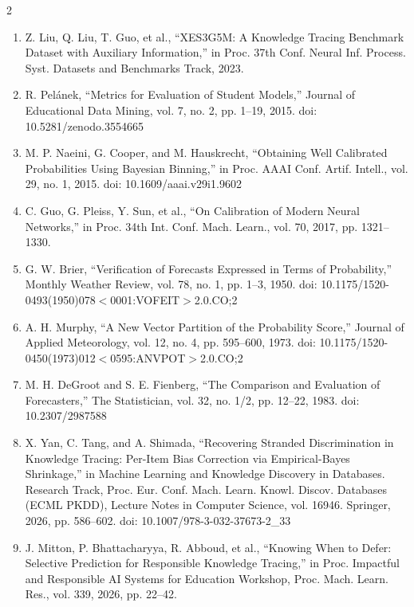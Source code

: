 \documentclass[10pt,a4paper]{article}
\begin{document}
\begin{multicols}{2}
{\begin{enumerate}
\item Z. Liu, Q. Liu, T. Guo, et al., ``XES3G5M: A Knowledge Tracing Benchmark Dataset with Auxiliary Information,'' in Proc. 37th Conf. Neural Inf. Process. Syst. Datasets and Benchmarks Track, 2023.

\item R. Pel\'{a}nek, ``Metrics for Evaluation of Student Models,'' Journal of Educational Data Mining, vol. 7, no. 2, pp. 1--19, 2015. doi: 10.5281/zenodo.3554665

\item M. P. Naeini, G. Cooper, and M. Hauskrecht, ``Obtaining Well Calibrated Probabilities Using Bayesian Binning,'' in Proc. AAAI Conf. Artif. Intell., vol. 29, no. 1, 2015. doi: 10.1609/aaai.v29i1.9602

\item C. Guo, G. Pleiss, Y. Sun, et al., ``On Calibration of Modern Neural Networks,'' in Proc. 34th Int. Conf. Mach. Learn., vol. 70, 2017, pp. 1321--1330.

\item G. W. Brier, ``Verification of Forecasts Expressed in Terms of Probability,'' Monthly Weather Review, vol. 78, no. 1, pp. 1--3, 1950. doi: 10.1175/1520-0493(1950)078$<$0001:VOFEIT$>$2.0.CO;2

\item A. H. Murphy, ``A New Vector Partition of the Probability Score,'' Journal of Applied Meteorology, vol. 12, no. 4, pp. 595--600, 1973. doi: 10.1175/1520-0450(1973)012$<$0595:ANVPOT$>$2.0.CO;2

\item M. H. DeGroot and S. E. Fienberg, ``The Comparison and Evaluation of Forecasters,'' The Statistician, vol. 32, no. 1/2, pp. 12--22, 1983. doi: 10.2307/2987588

\item X. Yan, C. Tang, and A. Shimada, ``Recovering Stranded Discrimination in Knowledge Tracing: Per-Item Bias Correction via Empirical-Bayes Shrinkage,'' in Machine Learning and Knowledge Discovery in Databases. Research Track, Proc. Eur. Conf. Mach. Learn. Knowl. Discov. Databases (ECML PKDD), Lecture Notes in Computer Science, vol. 16946. Springer, 2026, pp. 586--602. doi: 10.1007/978-3-032-37673-2\_33

\item J. Mitton, P. Bhattacharyya, R. Abboud, et al., ``Knowing When to Defer: Selective Prediction for Responsible Knowledge Tracing,'' in Proc. Impactful and Responsible AI Systems for Education Workshop, Proc. Mach. Learn. Res., vol. 339, 2026, pp. 22--42.


\end{enumerate}}
\end{multicols}
\end{document}
